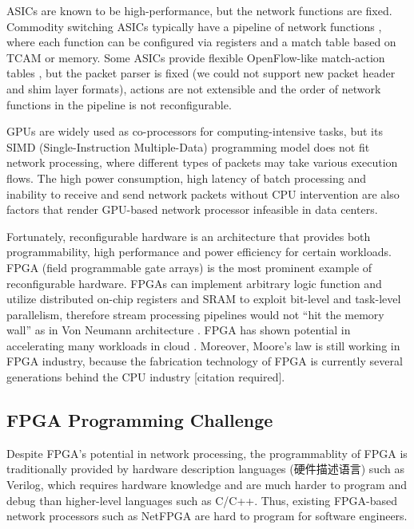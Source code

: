 {ASICs are known to be high-performance, but the network functions are fixed. Commodity switching ASICs typically have a pipeline of network functions \cite{broadcomethernet}, where each function can be configured via registers and a match table based on TCAM or memory. Some ASICs provide flexible OpenFlow-like match-action tables \cite{broadcomopenflow}, but the packet parser is fixed (we could not support new packet header and shim layer formats), actions are not extensible and the order of network functions in the pipeline is not reconfigurable.

GPUs are widely used as co-processors for computing-intensive tasks, but its SIMD (Single-Instruction Multiple-Data) programming model does not fit network processing, where different types of packets may take various execution flows. The high power consumption, high latency of batch processing and inability to receive and send network packets without CPU intervention are also factors that render GPU-based network processor infeasible in data centers.

Fortunately, reconfigurable hardware is an architecture that provides both programmability, high performance and power efficiency for certain workloads. FPGA (field programmable gate arrays) is the most prominent example of reconfigurable hardware. FPGAs can implement arbitrary logic function and utilize distributed on-chip registers and SRAM to exploit bit-level and task-level parallelism, therefore stream processing pipelines would not ``hit the memory wall'' as in Von Neumann architecture \cite{bacon2013fpga}. FPGA has shown potential in accelerating many workloads in cloud \cite{putnam2014reconfigurable}. Moreover, Moore's law is still working in FPGA industry, because the fabrication technology of FPGA is currently several generations behind the CPU industry [citation required].

\subsection{FPGA Programming Challenge}

Despite FPGA's potential in network processing, the programmablity of FPGA is traditionally provided by hardware description languages (硬件描述语言) such as Verilog, which requires hardware knowledge and are much harder to program and debug than higher-level languages such as C/C++. Thus, existing FPGA-based network processors such as NetFPGA \cite{lockwood2007netfpga} are hard to program for software engineers.

}
